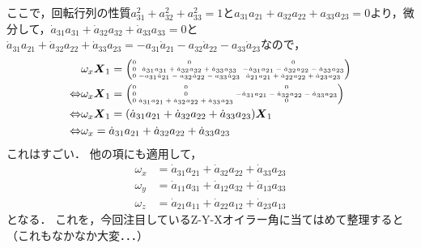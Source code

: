 ここで，回転行列の性質$a_{31}^2 + a_{32}^2 + a_{33}^2=1$と$a_{31} a_{21} + a_{32} a_{22} + a_{33} a_{23} = 0$より，微分して，$\dot{a}_{31} a_{31} + \dot{a}_{32} a_{32} + \dot{a}_{33} a_{33} = 0$と$\dot{a}_{31} a_{21} + \dot{a}_{32} a_{22} + \dot{a}_{33} a_{23} = - a_{31} \dot{a}_{21} - a_{32} \dot{a}_{22} - a_{33} \dot{a}_{23}$なので，
\begin{align}
  & \omega_{x} \boldsymbol{X}_1 =
  {\tiny
    \setlength\arraycolsep{1pt}
    \begin{pmatrix}
      0 & 0 & 0\\
      0 & \dot{a}_{31} a_{31} + \dot{a}_{32} a_{32} + \dot{a}_{33} a_{33} & - \dot{a}_{31} a_{21} - \dot{a}_{32} a_{22} - \dot{a}_{33} a_{23}\\
      0 & - a_{31} \dot{a}_{21} - a_{32} \dot{a}_{22} - a_{33} \dot{a}_{23} & \dot{a}_{21} a_{21} + \dot{a}_{22} a_{22} + \dot{a}_{23} a_{23}
  \end{pmatrix}}\\
  \Leftrightarrow & \omega_{x} \boldsymbol{X}_1 =
  {\tiny
    \setlength\arraycolsep{1pt}
    \begin{pmatrix}
      0 & 0 & 0\\
      0 & 0 & - \dot{a}_{31} a_{21} - \dot{a}_{32} a_{22} - \dot{a}_{33} a_{23}\\
      0 & \dot{a}_{31} a_{21} + \dot{a}_{32} a_{22} + \dot{a}_{33} a_{23} & 0
  \end{pmatrix}}\\
  \Leftrightarrow &
  \omega_{x} \boldsymbol{X}_1 =
  (\dot{a}_{31} a_{21} + \dot{a}_{32} a_{22} + \dot{a}_{33} a_{23}) \boldsymbol{X}_1\\
  \Leftrightarrow & \omega_{x} = \dot{a}_{31} a_{21} + \dot{a}_{32} a_{22} + \dot{a}_{33} a_{23}
\end{align}
これはすごい．
他の項にも適用して，
\begin{align}
  \omega_{x} &= \dot{a}_{31} a_{21} + \dot{a}_{32} a_{22} + \dot{a}_{33} a_{23}\\
  \omega_{y} &= \dot{a}_{11} a_{31} + \dot{a}_{12} a_{32} + \dot{a}_{13} a_{33}\\
  \omega_{z} &= \dot{a}_{21} a_{11} + \dot{a}_{22} a_{12} + \dot{a}_{23} a_{13}
\end{align}
となる．
これを，今回注目しているZ-Y-Xオイラー角に当てはめて整理すると（これもなかなか大変．．．）

